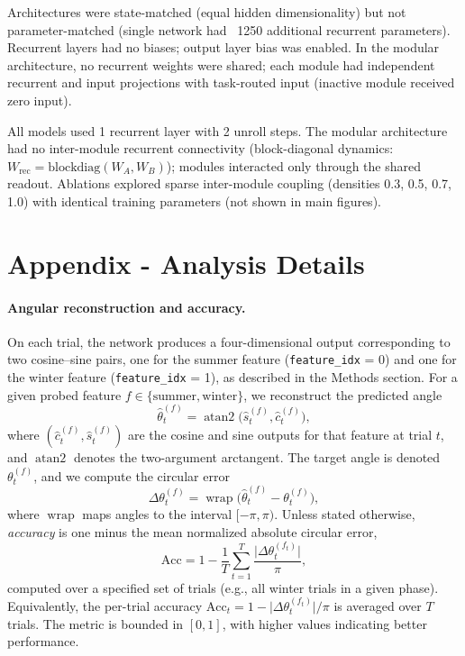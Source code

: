 Architectures were state-matched (equal hidden dimensionality) but not parameter-matched (single network had ~1250 additional recurrent parameters). Recurrent layers had no biases; output layer bias was enabled. In the modular architecture, no recurrent weights were shared; each module had independent recurrent and input projections with task-routed input (inactive module received zero input).

All models used 1 recurrent layer with 2 unroll steps. The modular architecture had no inter-module recurrent connectivity (block-diagonal dynamics: $W_{\mathrm{rec}} = \mathrm{blockdiag}(W_A, W_B)$); modules interacted only through the shared readout. Ablations explored sparse inter-module coupling (densities 0.3, 0.5, 0.7, 1.0) with identical training parameters (not shown in main figures).

\section{Appendix - Analysis Details}
\label{sec:appendix:analysis-details}

\paragraph{Angular reconstruction and accuracy.}
On each trial, the network produces a four-dimensional output corresponding to two cosine--sine pairs, one for the summer feature (\texttt{feature\_idx} = 0) and one for the winter feature (\texttt{feature\_idx} = 1), as described in the Methods section. For a given probed feature $f \in \{\text{summer}, \text{winter}\}$, we reconstruct the predicted angle
\[
\hat{\theta}_t^{(f)} = \operatorname{atan2}\!\big(\hat{s}_t^{(f)}, \hat{c}_t^{(f)}\big),
\]
where $(\hat{c}_t^{(f)}, \hat{s}_t^{(f)})$ are the cosine and sine outputs for that feature at trial $t$, and $\operatorname{atan2}$ denotes the two-argument arctangent. The target angle is denoted $\theta_t^{(f)}$, and we compute the circular error
\[
\Delta \theta_t^{(f)} = \operatorname{wrap}\big(\hat{\theta}_t^{(f)} - \theta_t^{(f)}\big),
\]
where $\operatorname{wrap}$ maps angles to the interval $[-\pi, \pi)$. Unless stated otherwise, \emph{accuracy} is one minus the mean normalized absolute circular error,
\[
\mathrm{Acc} = 1 - \frac{1}{T} \sum_{t=1}^T \frac{\lvert \Delta \theta_t^{(f_t)} \rvert}{\pi},
\]
computed over a specified set of trials (e.g., all winter trials in a given phase). Equivalently, the per-trial accuracy $\mathrm{Acc}_t = 1 - \lvert \Delta \theta_t^{(f_t)} \rvert / \pi$ is averaged over $T$ trials. The metric is bounded in $[0, 1]$, with higher values indicating better performance.

